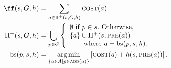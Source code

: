 \begin{align}
 \ff(s,G,h) &= \sum_{a\in \Pi^+(s,G,h)} \cost(a)\\
 \Pi^+(s,G,h) &= \bigcup_{p\in G}
 \left\{
  \begin{array}{l}
   \emptyset\ \text{if}\ p\in s.\ \text{Otherwise,}\\
   \braces{a} \cup \Pi^+(s,\pre(a)) \\
   \qquad \text{where}\ a=\text{bs}(p,s,h).
  \end{array}
 \right.\\
 \text{bs}(p,s,h)&=\argmin_{\braces{a\in A\mid p\in \adde(a)}} \left[\cost(a)+h(s, \pre(a))\right].
\end{align}

